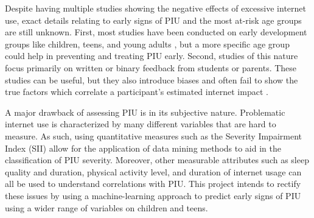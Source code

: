 \documentclass[11pt]{extarticle}
\begin{document}

Despite having multiple studies showing the negative effects of excessive internet use, exact details relating to early signs of PIU and the most at-risk age groups are still unknown.
First, most studies have been conducted on early development groups like children, teens, and young adults \cite{Pettorruso2020-qt,Cash2012-rb,Aboujaoude2010-mc,Restrepo2020-pb}, but a more specific age group could help in preventing and treating PIU early.
Second, studies of this nature focus primarily on written or binary feedback from students or parents. 
These studies can be useful, but they also introduce biases and often fail to show the true factors which correlate a participant's estimated internet impact \cite{Restrepo2020-pb,Aboujaoude2010-mc}.

A major drawback of assessing PIU is in its subjective nature. Problematic internet use is characterized by many different variables that are hard to measure. As such, using quantitative measures such as the Severity Impairment Index (SII) allow for the application of data mining methods to aid in the classification of PIU severity. Moreover, other measurable attributes such as sleep quality and duration, physical activity level, and duration of internet usage can all be used to understand correlations with PIU.
This project intends to rectify these issues by using a machine-learning approach to predict early signs of PIU using a wider range of variables on children and teens.

\end{document}
